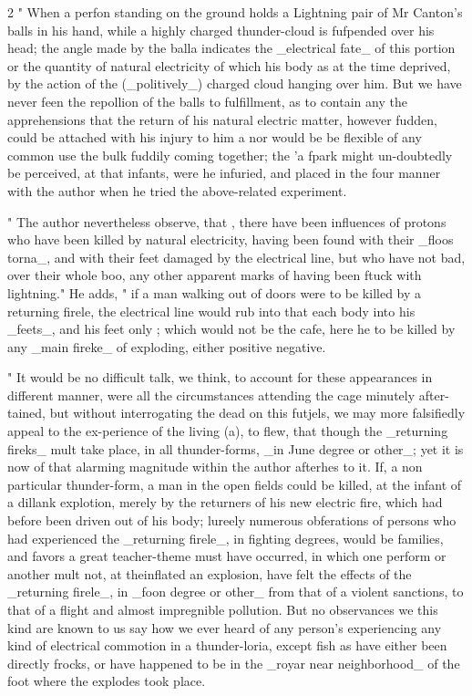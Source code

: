\documentclass[10pt]{article}
\begin{document}
\begin{multicols}{2}\raggedcolumns
" When a perfon standing on the ground holds a Lightning pair of Mr Canton's balls in his hand, while a highly charged thunder-cloud is fufpended over his head; the angle made by the balla indicates the \_electrical fate\_ of this portion or the quantity of natural electricity of which his body as at the time deprived, by the action of the (\_politively\_) charged cloud hanging over him. But we have never feen the repollion of the balls to fulfillment, as to contain any the apprehensions that the return of his natural electric matter, however fudden, could be attached with his injury to him a nor would be be flexible of any common use the bulk fuddily coming together; the 'a fpark might un-doubtedly be perceived, at that infants, were he infuried, and placed in the four manner with the author when he tried the above-related experiment.

" The author nevertheless observe, that , there have been influences of protons who have been killed by natural electricity, having been found with their \_floos torna\_, and with their feet damaged by the electrical line, but who have not bad, over their whole boo, any other apparent marks of having been ftuck with lightning." He adds, " if a man walking out of doors were to be killed by a returning firele, the electrical line would rub into that each body into his \_feets\_, and his feet only ; which would not be the cafe, here he to be killed by any \_main fireke\_ of exploding, either positive negative.

" It would be no difficult talk, we think, to account for these appearances in different manner, were all the circumstances attending the cage minutely after-tained, but without interrogating the dead on this futjels, we may more falsifiedly appeal to the ex-perience of the living (a), to flew, that though the \_returning fireks\_ mult take place, in all thunder-forms, \_in June degree or other\_; yet it is now of that alarming magnitude within the author afterhes to it. If, a non particular thunder-form, a man in the open fields could be killed, at the infant of a dillank explotion, merely by the returners of his new electric fire, which had before been driven out of his body; lureely numerous obferations of persons who had experienced the \_returning firele\_, in fighting degrees, would be families, and favors a great teacher-theme must have occurred, in which one perform or another mult not, at theinflated an explosion, have felt the effects of the \_returning firele\_, in \_foon degree or other\_ from that of a violent sanctions, to that of a flight and almost impregnible pollution. But no observances we this kind are known to us say how we ever heard of any person's experiencing any kind of electrical commotion in a thunder-loria, except fish as have either been directly frocks, or have happened to be in the \_royar near neighborhood\_ of the foot where the explodes took place.


\end{multicols}
\end{document}
